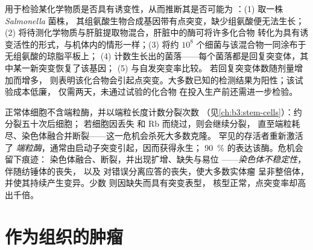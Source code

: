 \begin{method}[Ames 试验]\label{met:b3:cancer-biology:ames}
用于检验某化学物质是否具有诱变性，从而推断其是否可能为
：(1) 取一株 \emph{Salmonella} 菌株，
其组氨酸生物合成基因带有点突变，缺少组氨酸便无法生长；
(2) 将待测化学物质与肝脏提取物混合，肝脏中的酶可将许多化合物
转化为具有诱变活性的形式，与机体内的情形一样；(3)
将约 $10^{8}$ 个细菌与该混合物一同涂布于无组氨酸的琼脂平板上；
(4) 计数生长出的菌落——每个菌落都是回复突变体，其中某一新突变恢复了该基因；
(5) 与自发突变率比较。
若回复突变体数随剂量增加而增多，
则表明该化合物会引起点突变。大多数已知的检测结果为阳性；该试验成本低廉，
仅需两天，未通过试验的化合物
在投入生产前还需进一步检验。
\end{method}

\begin{definition}[永生与不稳定性]\label{def:b3:cancer-biology:telomerase}
正常体细胞不含端粒酶，并以端粒长度计数分裂次数
（见\cref{ch:b3:stem-cells}）：约分裂五十次后细胞；
若细胞因丢失  和 Rb 而绕过，则会继续分裂，
直至端粒耗尽、染色体融合并断裂——这一危机会杀死大多数克隆。
罕见的存活者重新激活了
\emph{端粒酶}，通常由启动子突变引起，因而获得永生；
\qty{90}{\%} 的表达该酶。危机会留下痕迹：
染色体融合、断裂，并出现扩增、缺失与易位
——\emph{染色体不稳定性}，伴随纺锤体的丧失，
以及  对错误分离应答的丧失，使大多数实体瘤
呈非整倍体，并使其持续产生变异。少数
则因缺失而具有突变表型，
核型正常，点突变率却高出千倍。
\end{definition}

\section{作为组织的肿瘤}

